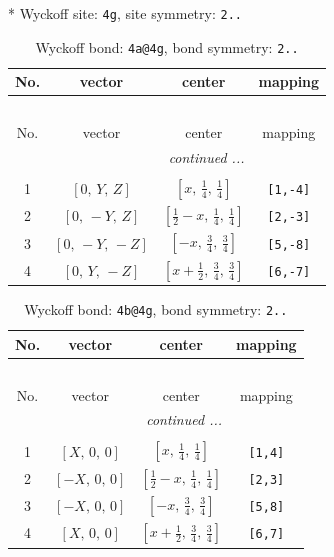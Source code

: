 \documentclass[fleqn,8pt]{jsarticle}
\begin{document}
* Wyckoff site: {\tt 4g}, site symmetry: {\tt 2..}
\renewcommand{\arraystretch}{1.2}
\begin{longtable}{cccc}
\caption{Wyckoff bond: {\tt 4a@4g}, bond symmetry: {\tt 2..}}
 \\
 \hline \hline
No. & vector & center & mapping \\ \hline \endfirsthead

\multicolumn{3}{l}{\tablename\ \thetable{}} \\
 \hline \hline
No. & vector & center & mapping \\ \hline \endhead

 \hline \hline
\multicolumn{3}{r}{\footnotesize\it continued ...} \\ \endfoot

 \hline \hline
\multicolumn{3}{r}{} \\ \endlastfoot

1 & $\left[ 0,\, Y,\, Z \right]$ & $\left[ x,\, \frac{1}{4},\, \frac{1}{4} \right]$ & {\tt [1,-4]} \\ \hline
2 & $\left[ 0,\, - Y,\, Z \right]$ & $\left[ \frac{1}{2} - x,\, \frac{1}{4},\, \frac{1}{4} \right]$ & {\tt [2,-3]} \\ \hline
3 & $\left[ 0,\, - Y,\, - Z \right]$ & $\left[ - x,\, \frac{3}{4},\, \frac{3}{4} \right]$ & {\tt [5,-8]} \\ \hline
4 & $\left[ 0,\, Y,\, - Z \right]$ & $\left[ x + \frac{1}{2},\, \frac{3}{4},\, \frac{3}{4} \right]$ & {\tt [6,-7]} \\
\end{longtable}
\renewcommand{\arraystretch}{1.2}
\begin{longtable}{cccc}
\caption{Wyckoff bond: {\tt 4b@4g}, bond symmetry: {\tt 2..}}
 \\
 \hline \hline
No. & vector & center & mapping \\ \hline \endfirsthead

\multicolumn{3}{l}{\tablename\ \thetable{}} \\
 \hline \hline
No. & vector & center & mapping \\ \hline \endhead

 \hline \hline
\multicolumn{3}{r}{\footnotesize\it continued ...} \\ \endfoot

 \hline \hline
\multicolumn{3}{r}{} \\ \endlastfoot

1 & $\left[ X,\, 0,\, 0 \right]$ & $\left[ x,\, \frac{1}{4},\, \frac{1}{4} \right]$ & {\tt [1,4]} \\ \hline
2 & $\left[ - X,\, 0,\, 0 \right]$ & $\left[ \frac{1}{2} - x,\, \frac{1}{4},\, \frac{1}{4} \right]$ & {\tt [2,3]} \\ \hline
3 & $\left[ - X,\, 0,\, 0 \right]$ & $\left[ - x,\, \frac{3}{4},\, \frac{3}{4} \right]$ & {\tt [5,8]} \\ \hline
4 & $\left[ X,\, 0,\, 0 \right]$ & $\left[ x + \frac{1}{2},\, \frac{3}{4},\, \frac{3}{4} \right]$ & {\tt [6,7]} \\
\end{longtable}
\end{document}
